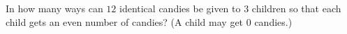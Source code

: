 In how many ways can $12$ identical candies be given to $3$ children so that each child gets an even number of candies? (A child may get $0$ candies.)
